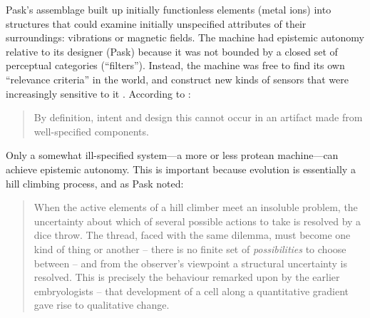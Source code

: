 

Pask's assemblage built up initially functionless elements (metal ions) into structures
that could examine
initially unspecified attributes of their surroundings: vibrations or magnetic fields.
The machine had epistemic autonomy
relative to its designer (Pask) because it was
not bounded by a
closed set of perceptual categories (``filters'').
Instead,
the machine was free to 
find its own ``relevance criteria'' in the world,
and
construct new kinds of sensors that were increasingly sensitive to it \cite{cariani1993evolve}.
According to \citet{pask1961approach}:
%
\begin{quote}
\small
By definition, intent and design this cannot occur in an artifact made from well-specified components. 
\end{quote}
%
Only a somewhat ill-specified system---a more or less protean machine---can achieve epistemic autonomy.
This is important because 
evolution is essentially a hill climbing process, and as
Pask noted:
%
\begin{quote}
\small
When the active elements of a hill climber meet an insoluble
problem, the uncertainty about which of several possible actions
to take is resolved by a dice throw. 
The thread, faced with the same dilemma, must become one kind of thing or another -- there
is no finite set of \textit{possibilities} to choose between %
-- and from the observer's viewpoint a structural uncertainty is resolved. 
This is precisely the behaviour remarked upon by the earlier embryologists -- that development of a cell along a quantitative gradient gave rise to qualitative change.
\end{quote}



